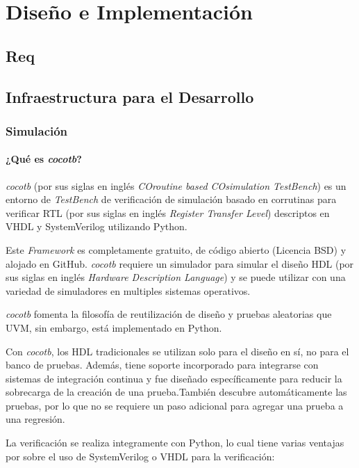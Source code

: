 \chapter{Diseño e Implementación}
\label{Chapter3}

\section{Req}

% 

\section{Infraestructura para el Desarrollo}

\subsection{Simulación}

\subsubsection{¿Qué es \textit{cocotb}?}
\textit{cocotb} (por sus siglas en inglés \textit{COroutine based COsimulation TestBench}) es
un entorno de \textit{TestBench} de verificación de simulación basado en
corrutinas para verificar RTL (por sus siglas en inglés \textit{Register Transfer Level})
descriptos en VHDL y SystemVerilog utilizando Python.

Este \textit{Framework} es completamente gratuito, de código abierto (Licencia
BSD) y alojado en GitHub. \textit{cocotb} requiere un simulador para simular el
diseño HDL (por sus siglas en inglés \textit{Hardware Description Language}) y se puede
utilizar con una variedad de simuladores en multiples sistemas operativos.

\textit{cocotb} fomenta la filosofía de reutilización de diseño y pruebas
aleatorias que UVM, sin embargo, está implementado en Python.

Con \textit{cocotb}, los HDL tradicionales se utilizan solo para el diseño en
sí, no para el banco de pruebas. Además, tiene soporte incorporado para
integrarse con sistemas de integración continua y fue diseñado específicamente
para reducir la sobrecarga de la creación de una prueba.También descubre
automáticamente las pruebas, por lo que no se requiere un paso adicional para
agregar una prueba a una regresión.

La verificación se realiza integramente con Python, lo cual tiene varias
ventajas por sobre el uso de SystemVerilog o VHDL para la verificación:

